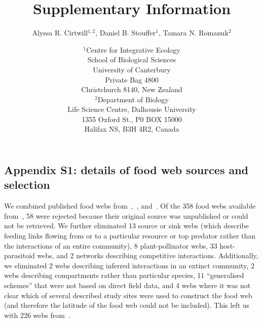 \documentclass[12pt]{article}
\newcommand{\beginsupplement}{%
        \setcounter{table}{0}
        \renewcommand{\thetable}{S\arabic{table}}%
        \setcounter{figure}{0}
        \renewcommand{\thefigure}{S\arabic{figure}}%
     }
\begin{document}
\title{Supplementary Information}
\author{Alyssa R. Cirtwill$^{1,2}$, Daniel B. Stouffer$^{1}$, Tamara N. Romanuk$^{2}$}
\date{\footnotesize$^1$Centre for Integrative Ecology\\School of Biological Sciences\\University of Canterbury\\
Private Bag 4800\\Christchurch 8140, New Zealand \\
\medskip$^2$Department of Biology\\
Life Science Centre, Dalhousie University\\1355 Oxford St., P0 BOX 15000\\
Halifax NS, B3H 4R2, Canada\\}



\maketitle
\baselineskip=8.5mm

\vspace{0.4 in}
\beginsupplement
\linenumbers

\subsection*{Appendix S1: details of food web sources and selection}

  We combined published food webs from~\cite{GlobalWeb},~\cite{Riede2011},
  and~\cite{Dunne2013}. Of the 358 food webs available
  from~\cite{GlobalWeb}, 58 were rejected because their original source was
  unpublished or could not be retrieved. We further eliminated 13 source or
  sink webs (which describe feeding links flowing from or to a particular
  resource or top predator rather than the interactions of an entire
  community), 8 plant-pollinator webs, 33 host-parasitoid webs, and 2 networks
  describing competitive interactions. Additionally, we eliminated 2 webs
  describing  inferred interactions in an extinct community, 2 webs describing compartments rather than particular species,
  11 ``generalised
  schemes'' that were not based on direct field data, and 4 webs where it was
  not clear which of several described study sites were used to construct the
  food web (and therefore the latitude of the food web could not be
  included). This left us with 226 webs from~\cite{GlobalWeb}. 
\end{document}
